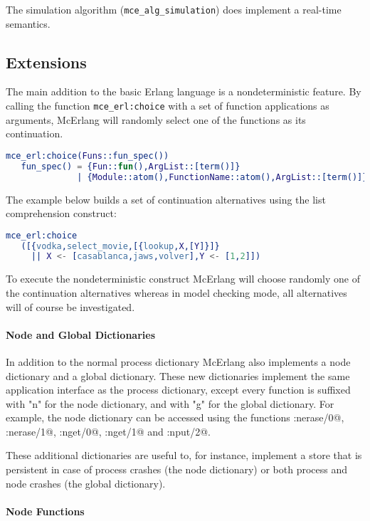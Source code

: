 \documentclass[a4paper]{article}
\begin{document}
The simulation algorithm (\lstinline{mce_alg_simulation})
does implement a real-time semantics.

\subsection{Extensions}

The main addition to the basic Erlang language is a nondeterministic feature.
By calling the function \lstinline{mce_erl:choice} with
a set of function applications as arguments, McErlang will randomly select one
of the functions as its continuation.
\begin{lstlisting}[language=Erlang]
mce_erl:choice(Funs::fun_spec())
   fun_spec() = {Fun::fun(),ArgList::[term()]} 
              | {Module::atom(),FunctionName::atom(),ArgList::[term()]}
\end{lstlisting}

The example below builds a set of continuation alternatives using
the list comprehension construct:
\begin{lstlisting}[language=Erlang]
mce_erl:choice
   ([{vodka,select_movie,[{lookup,X,[Y]}]} 
     || X <- [casablanca,jaws,volver],Y <- [1,2]])
\end{lstlisting}
To execute the nondeterministic construct 
McErlang will choose randomly one of the continuation alternatives
whereas in model checking mode, all alternatives will of course be 
investigated.

\paragraph{Node and Global Dictionaries}

In addition to the normal process dictionary McErlang also implements
a node dictionary and a global dictionary. These new dictionaries
implement the same application
interface as the process dictionary, except every function
is suffixed with "n" for the node dictionary, and with "g" for
the global dictionary. For example, the node dictionary can be
accessed using the functions 
\lstinline@mcerlang:nerase/0@, 
\lstinline@mcerlang:nerase/1@, 
\lstinline@mcerlang:nget/0@, 
\lstinline@mcerlang:nget/1@
and \lstinline@mcerlang:nput/2@.

These additional dictionaries are useful
to, for instance, implement a store that
is persistent in case of process crashes
(the node dictionary) or both process and
node crashes (the global dictionary).

\paragraph{Node Functions}
\end{document}
